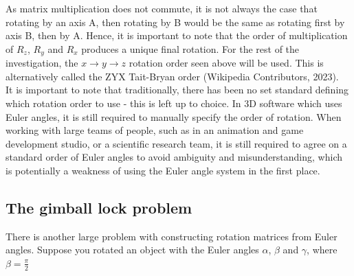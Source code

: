 \documentclass[12pt, a4paper]{article}
\begin{document}
As matrix multiplication does not commute, it is not always the case that
rotating by an axis A, then rotating by B would be the same as rotating first by
axis B, then by A. Hence, it is important to note that the order of
multiplication of $R_z$, $R_y$ and $R_x$ produces a unique final rotation. For
the rest of the investigation, the $x \to y \to z$ rotation order seen above
will be used. This is alternatively called the ZYX Tait-Bryan order (Wikipedia
Contributors, 2023). \\

It is important to note that traditionally, there has been no set standard
defining which rotation order to use - this is left up to choice. In 3D software
which uses Euler angles, it is still required to manually specify the order of
rotation. When working with large teams of people, such as in an animation and
game development studio, or a scientific research team, it is still required to
agree on a standard order of Euler angles to avoid ambiguity and
misunderstanding, which is potentially a weakness of using the Euler angle
system in the first place. \\

\pagebreak
\subsection{The gimball lock problem}
There is another large problem with constructing rotation matrices from Euler
angles. Suppose you rotated an object with the Euler angles
$\alpha$, $\beta$ and $\gamma$, where $\beta=\frac{\pi}{2}$
\end{document}
